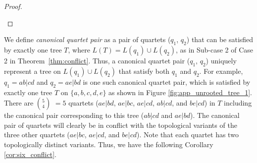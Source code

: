 \documentclass[10pt,a4paper]{article}
\newcommand{\add}[1]{{\color{blue} #1}}
\newtheorem{corollary}{Corollary}[theorem]
\begin{document}
\begin{appendices}
\begin{proof}
\begin{itemize}
\begin{itemize}
 
\end{itemize}



\end{itemize}

\end{proof}

We define \textit{canonical quartet pair} as a pair of quartets ($q_1$, $q_2$) that can be satisfied by exactly one tree $T$, where $L(T) = L(q_1) \cup L(q_2)$, as in Sub-case 2 of Case 2 in Theorem~\ref{thm:conflict}. Thus, a canonical quartet pair ($q_1$, $q_2$) uniquely represent a tree on $L(q_1) \cup L(q_2)$ that satisfy both $q_1$ and $q_2$. For example, $q_1 = ab|cd$ and $q_2 = ae|bd$ %
is one such canonical quartet pair, which is satisfied by exactly one tree $T$ on $\{a,b,c,d,e\}$ as shown in Figure \ref{fig:app_unrooted_tree_1}. There are $5 \choose 4$ $=5$ quartets ($ae|bd$, $ae|bc$, $ae|cd$, $ab|cd$, and $be|cd$) in $T$ including the canonical pair corresponding to this tree ($ab|cd$ and $ae|bd$). The canonical pair of quartets will clearly be in conflict with the topological variants of the three other quartets ($ae|bc$, $ae|cd$, and $be|cd$). Note that each quartet has two topologically distinct variants. Thus, we have the following Corollary \ref{cor:six_conflict}.






\end{appendices}
\end{document}
